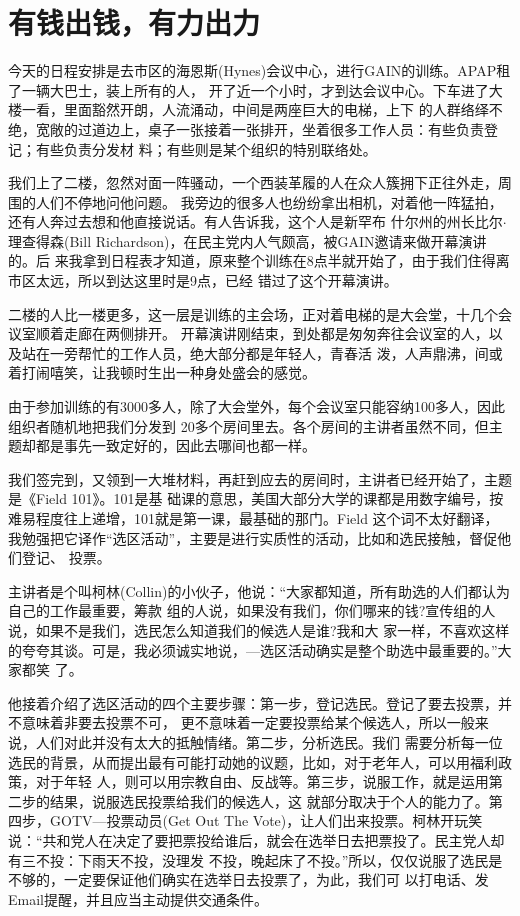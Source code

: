 ﻿\documentclass[11pt]{article}
\begin{document}
\section{有钱出钱，有力出力}

今天的日程安排是去市区的海恩斯(Hynes)会议中心，进行GAIN的训练。APAP租了一辆大巴士，装上所有的人，
开了近一个小时，才到达会议中心。下车进了大楼一看，里面豁然开朗，人流涌动，中间是两座巨大的电梯，上下
的人群络绎不绝，宽敞的过道边上，桌子一张接着一张排开，坐着很多工作人员：有些负责登记；有些负责分发材
料；有些则是某个组织的特别联络处。

我们上了二楼，忽然对面一阵骚动，一个西装革履的人在众人簇拥下正往外走，周围的人们不停地问他问题。
我旁边的很多人也纷纷拿出相机，对着他一阵猛拍，还有人奔过去想和他直接说话。有人告诉我，这个人是新罕布
什尔州的州长比尔$\cdot$理查得森(Bill Richardson)，在民主党内人气颇高，被GAIN邀请来做开幕演讲的。后
来我拿到日程表才知道，原来整个训练在8点半就开始了，由于我们住得离市区太远，所以到达这里时是9点，已经
错过了这个开幕演讲。

二楼的人比一楼更多，这一层是训练的主会场，正对着电梯的是大会堂，十几个会议室顺着走廊在两侧排开。
开幕演讲刚结束，到处都是匆匆奔往会议室的人，以及站在一旁帮忙的工作人员，绝大部分都是年轻人，青春活
泼，人声鼎沸，间或着打闹嘻笑，让我顿时生出一种身处盛会的感觉。

由于参加训练的有3000多人，除了大会堂外，每个会议室只能容纳100多人，因此组织者随机地把我们分发到
20多个房间里去。各个房间的主讲者虽然不同，但主题却都是事先一致定好的，因此去哪间也都一样。

我们签完到，又领到一大堆材料，再赶到应去的房间时，主讲者已经开始了，主题是《Field 101》。101是基
础课的意思，美国大部分大学的课都是用数字编号，按难易程度往上递增，101就是第一课，最基础的那门。Field
这个词不太好翻译，我勉强把它译作``选区活动''，主要是进行实质性的活动，比如和选民接触，督促他们登记、
投票。

主讲者是个叫柯林(Collin)的小伙子，他说：``大家都知道，所有助选的人们都认为自己的工作最重要，筹款
组的人说，如果没有我们，你们哪来的钱?宣传组的人说，如果不是我们，选民怎么知道我们的候选人是谁?我和大
家一样，不喜欢这样的夸夸其谈。可是，我必须诚实地说，---选区活动确实是整个助选中最重要的。''大家都笑
了。

他接着介绍了选区活动的四个主要步骤：第一步，登记选民。登记了要去投票，并不意味着非要去投票不可，
更不意味着一定要投票给某个候选人，所以一般来说，人们对此并没有太大的抵触情绪。第二步，分析选民。我们
需要分析每一位选民的背景，从而提出最有可能打动她的议题，比如，对于老年人，可以用福利政策，对于年轻
人，则可以用宗教自由、反战等。第三步，说服工作，就是运用第二步的结果，说服选民投票给我们的候选人，这
就部分取决于个人的能力了。第四步，GOTV---投票动员(Get Out The Vote)，让人们出来投票。柯林开玩笑
说：``共和党人在决定了要把票投给谁后，就会在选举日去把票投了。民主党人却有三不投：下雨天不投，没理发
不投，晚起床了不投。''所以，仅仅说服了选民是不够的，一定要保证他们确实在选举日去投票了，为此，我们可
以打电话、发Email提醒，并且应当主动提供交通条件。
\end{document}

